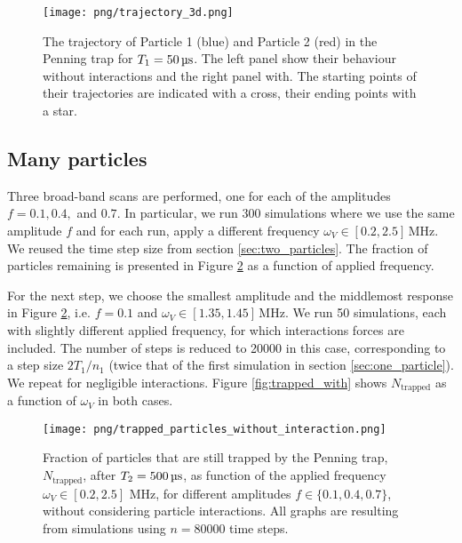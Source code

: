 \begin{figure}
    \texttt{[image: png/trajectory\_3d.png]}
    \caption{The trajectory of Particle 1 (blue) and Particle 2 (red) in the Penning trap for $T_1=50\,\mus$. The left panel show their behaviour without interactions and the right panel with. The starting points of their trajectories are indicated with a cross, their ending points with a star.}
    \label{fig:3d_trajectory}
\end{figure}
\twocolumngrid





\subsection{Many particles}\label{sec:many_particles}

Three broad-band scans are performed, one for each of the amplitudes $f=0.1, 0.4,$ and $0.7$. In particular, we run 300 simulations where we use the same amplitude $f$ and for each run, apply a different frequency $\omega_V \in[0.2,2.5] \,\mathrm{MHz}$. We reused the time step size from section \ref{sec:two_particles}. The fraction of particles remaining is presented in Figure \ref{fig:trapped_without} as a function of applied frequency. 

For the next step, we choose the smallest amplitude and the middlemost response in Figure \ref{fig:trapped_without}, i.e. $f=0.1$ and $\omega_V \in[1.35,1.45] \,\mathrm{MHz}$. We run 50 simulations, each with slightly different applied frequency, for which interactions forces are included. The number of steps is reduced to 20000 in this case, corresponding to a step size $2 T_1/n_1$ (twice that of the first simulation in section \ref{sec:one_particle}). We repeat for negligible interactions. Figure \ref{fig:trapped_with} shows $N_\mathrm{trapped}$ as a function of $\omega_V$ in both cases. 


\begin{figure}
    \texttt{[image: png/trapped\_particles\_without\_interaction.png]}
    \caption{Fraction of particles that are still trapped by the Penning trap, $N_\mathrm{trapped}$, after $T_2=500\,\mus$, as function of the applied frequency $\omega_V\in[0.2,2.5]$ MHz, for different amplitudes $f\in\{0.1, 0.4, 0.7\}$, without considering particle interactions. All graphs are resulting from simulations using $n=80000$ time steps.}
    \label{fig:trapped_without}
\end{figure}

